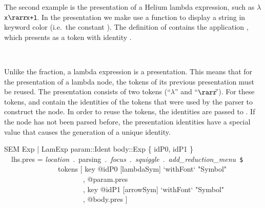 
The second example is the presentation of a Helium lambda expression, such as $\lambda$\verb|x|$\rarr\!$\verb|x+1|. In the presentation we make  use a function  to display a string in keyword color (i.e.\ the constant ). The definition of  contains the application , which  presents  as a token with identity .

\begin{small}
\\
\end{small}

Unlike the fraction, a lambda expression is a  presentation. This means that for the presentation of a lambda node, the tokens of its previous presentation must be reused. The presentation consists of two tokens (``$\lambda$'' and ``$\rarr\!\!$''). For these tokens,  and  contain the identities of the tokens that were used by the parser to construct the node. In order to reuse the tokens, the identities are passed to . If the node has not been parsed before, the presentation identities have a special value that causes the generation of a unique identity. 



\ttfamily\begin{small}\begin{tabbing}
SEM Exp | LamExp param::Ident body::Exp \{ idP0, idP1 \} \\
~~lhs.pres = {\em location}~.~parsing~.~{\em focus}~.~{\em squiggle}~.~{\em add\_reduction\_menu}~\verb|$|\\
~~~~~~~~~~~~~~~tokens [ key @idP0 [lambdaSym] `withFont` "Symbol"\\ %
~~~~~~~~~~~~~~~~~~~~~~, @param.pres\\
~~~~~~~~~~~~~~~~~~~~~~, key @idP1 [arrowSym] `withFont` "Symbol"\\ %
~~~~~~~~~~~~~~~~~~~~~~, @body.pres ] \\
\end{tabbing}\end{small}\rmfamily

